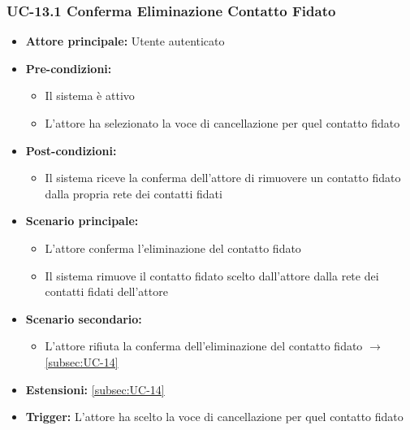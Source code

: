 \documentclass[a4paper,12pt]{article}
\begin{document}
\subsubsection{UC-13.1 Conferma Eliminazione Contatto Fidato} \label{subsec:UC-13.1}
\begin{itemize}
    \item \textbf{Attore principale:} Utente autenticato
    \item \textbf{Pre-condizioni:}
    \begin{itemize}
        \item Il sistema è attivo
        \item L'attore ha selezionato la voce di cancellazione per quel contatto fidato
    \end{itemize}
    \item \textbf{Post-condizioni:}
    \begin{itemize}
        \item Il sistema riceve la conferma dell'attore di rimuovere un contatto fidato dalla propria rete dei contatti fidati
    \end{itemize}
    \item \textbf{Scenario principale:}
    \begin{itemize}
        \item L'attore conferma l'eliminazione del contatto fidato
        \item Il sistema rimuove il contatto fidato scelto dall'attore dalla rete dei contatti fidati dell'attore
    \end{itemize}
    \item \textbf{Scenario secondario:}
    \begin{itemize}
        \item L'attore rifiuta la conferma dell'eliminazione del contatto fidato $\rightarrow$ \ref{subsec:UC-14}
    \end{itemize}
    \item \textbf{Estensioni:} \ref{subsec:UC-14}
    \item \textbf{Trigger:} L'attore ha scelto la voce di cancellazione per quel contatto fidato
\end{itemize}
\end{document}
